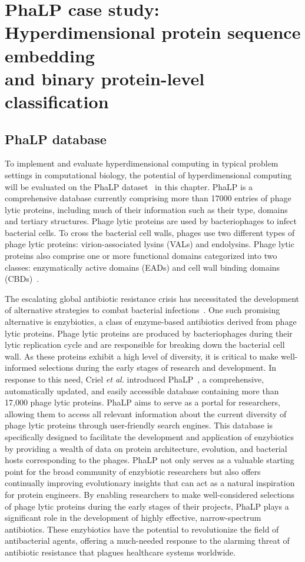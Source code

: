 \chapter[PhaLP case study: Hyperdimensional protein sequence embedding and binary protein-level classification]{PhaLP case study:\\Hyperdimensional protein sequence embedding\\and binary protein-level classification}
\section{PhaLP database}
To implement and evaluate hyperdimensional computing in typical problem settings in computational biology, the potential of hyperdimensional computing will be evaluated on the PhaLP dataset~\cite{phalp} in this chapter. PhaLP is a comprehensive database currently comprising more than 17000 entries of phage lytic proteins, including much of their information such as their type, domains and tertiary structures. Phage lytic proteins are used by bacteriophages to infect bacterial cells. To cross the bacterial cell walls, phages use two different types of phage lytic proteins: virion-associated lysins (VALs) and endolysins. Phage lytic proteins also comprise one or more functional domains categorized into two classes: enzymatically active domains (EADs) and cell wall binding domains (CBDs)~\cite{phage}.

The escalating global antibiotic resistance crisis has necessitated the development of alternative strategies to combat bacterial infections~\cite{antibiotic}. One such promising alternative is enzybiotics, a class of enzyme-based antibiotics derived from phage lytic proteins. Phage lytic proteins are produced by bacteriophages during their lytic replication cycle and are responsible for breaking down the bacterial cell wall. As these proteins exhibit a high level of diversity, it is critical to make well-informed selections during the early stages of research and development. In response to this need, Criel \textit{ et al.} introduced PhaLP~\cite{phalp}, a comprehensive, automatically updated, and easily accessible database containing more than 17,000 phage lytic proteins. PhaLP aims to serve as a portal for researchers, allowing them to access all relevant information about the current diversity of phage lytic proteins through user-friendly search engines. This database is specifically designed to facilitate the development and application of enzybiotics by providing a wealth of data on protein architecture, evolution, and bacterial hosts corresponding to the phages. PhaLP not only serves as a valuable starting point for the broad community of enzybiotic researchers but also offers continually improving evolutionary insights that can act as a natural inspiration for protein engineers. By enabling researchers to make well-considered selections of phage lytic proteins during the early stages of their projects, PhaLP plays a significant role in the development of highly effective, narrow-spectrum antibiotics. These enzybiotics have the potential to revolutionize the field of antibacterial agents, offering a much-needed response to the alarming threat of antibiotic resistance that plagues healthcare systems worldwide.

